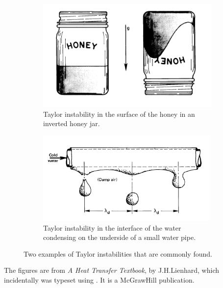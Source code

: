 \begin{dispListing}
\captionsetup[figure]{margin=10pt,font=small,labelfont=bf,format=hang}%

\begin{figure}[htbp]
\centering
  \begin{subfigure}[b]{0.5\textwidth}
  \includegraphics[width=\linewidth]{./graphics/honey.png}
  \caption{Taylor instability in the surface of the honey in an inverted honey jar.}\label{fig:honey}
    \hspace{1cm}
  \end{subfigure}

  \begin{subfigure}[b]{0.9\textwidth}
     \centering
     \includegraphics[width=9cm]{./graphics/honeydrops.png}
     \caption{Taylor instability in the interface of the water condensing on the underside of a small water pipe.}
  \end{subfigure}  
  \caption{Two examples of Taylor instabilities that are commonly found.}%
    \label{fig:Athird}%
\end{figure}

The figures are from \textit{A Heat Transfer Textbook}, by J.H.Lienhard, which incidentally was typeset using
\tex . It is a McGrawHill publication. 


\end{dispListing}
